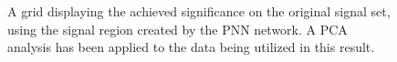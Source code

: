 \begin{figure}[H]
    \caption{A grid displaying the achieved significance on the original signal set, using the signal region 
    created by the \ac{PNN} network. A \ac{PCA} analysis has been applied to the data being utilized in this result.}
    \label{fig:PNNPCAGridSig}
\end{figure}

